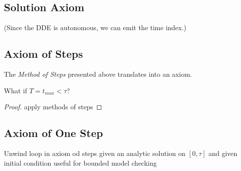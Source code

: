 \documentclass[10pt]{report}
\begin{document}
    \subsection{Solution Axiom}
        \label{sec:solution-axiom}

        (Since the DDE is autonomous, we can emit the time index.)


    \subsection{Axiom of Steps}
        \label{sec:axiom-of-steps}

        The \emph{Method of Steps} presented above translates into an axiom.

        \begin{calculus}


        \end{calculus}

        What if $T=t_{max} < \tau$?

        \begin{proof}
            apply methods of steps
        \end{proof}

    \subsection{Axiom of One Step}
        \label{sex:axiom-of-one-step}

        Unwind loop in axiom od steps
        given an analytic solution on $[0,\tau]$ and given initial condition
        useful for bounded model checking
\end{document}
